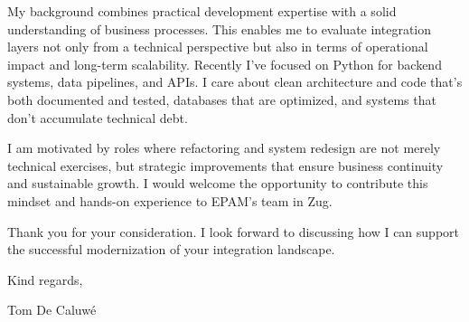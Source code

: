 \documentclass[12pt,a4paper]{letter}
\begin{document}
My background combines practical development expertise with a solid understanding of business processes. This enables me to evaluate integration layers not only from a technical perspective but also in terms of operational impact and long-term scalability. Recently I've focused on Python for backend systems, data pipelines, and APIs. I care about clean architecture and code that's both documented and tested, databases that are optimized, and systems that don't accumulate technical debt.

I am motivated by roles where refactoring and system redesign are not merely technical exercises, but strategic improvements that ensure business continuity and sustainable growth. I would welcome the opportunity to contribute this mindset and hands-on experience to EPAM’s team in Zug.

Thank you for your consideration. I look forward to discussing how I can support the successful modernization of your integration landscape.

Kind regards,

Tom De Caluwé


\end{document}
